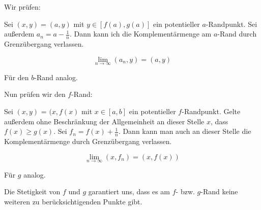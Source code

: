 \documentclass[a4paper,german,12pt,smallheadings]{scrartcl}
\begin{document}
Wir prüfen:

Sei $(x,y) = (a,y)$ mit $y \in [f(a), g(a)]$ ein potentieller $a$-Randpunkt.
Sei außerdem $a_n = a - \frac{1}{n}$. Dann kann ich die Komplementärmenge am $a$-Rand durch
Grenzübergang verlassen.

\begin{equation*}
  \lim_{n \to \infty} (a_n, y) = (a, y)
\end{equation*}

Für den $b$-Rand analog.

Nun prüfen wir den $f$-Rand:

Sei $(x,y)$ = $(x, f(x)$ mit $x \in [a,b]$ ein potentieller $f$-Randpunkt. Gelte
außerdem ohne Beschränkung der Allgemeinheit an dieser Stelle $x$, dass $f(x) \ge g(x)$.
Sei $f_n = f(x) + \frac{1}{n}$. Dann kann man auch an dieser Stelle die
Komplementärmenge durch Grenzübergang verlassen.

\begin{equation*}
  \lim_{n \to \infty} (x, f_n) = (x, f(x))
\end{equation*}

Für $g$ analog.

Die Stetigkeit von $f$ und $g$ garantiert uns, dass es am $f$- bzw. $g$-Rand
keine weiteren zu berücksichtigenden Punkte gibt.
\end{document}
